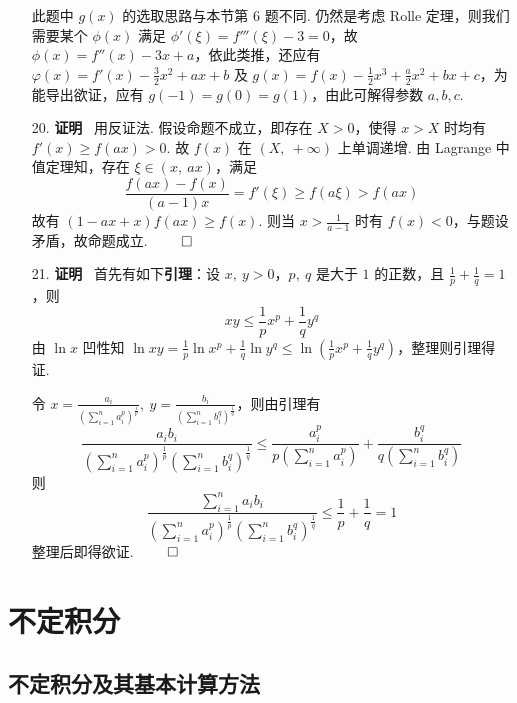 \documentclass[11pt,oneside,fontset=fandol]{ctexbook} %
\begin{document}
\begin{enumerate}
    此题中 $g(x)$ 的选取思路与本节第 6 题不同. 仍然是考虑 Rolle 定理，则我们需要某个 $\phi(x)$ 满足 $\phi'(\xi) = f'''(\xi) - 3 = 0$，故 $\phi(x) = f''(x) - 3x + a$，依此类推，还应有 $\varphi(x) = f'(x) - \frac 3 2 x^2 + ax + b$ 及 $g(x) = f(x) - \frac 1 2 x^3 + \frac a 2 x^2 + bx + c$，为能导出欲证，应有 $g(-1) = g(0) = g(1)$，由此可解得参数 $a, b, c$.
    \item[20.]
    \textbf{证明} \ 用反证法. 假设命题不成立，即存在 $X > 0$，使得 $x > X$ 时均有 $f'(x) \geqslant f(ax) > 0$. 故 $f(x)$ 在 $(X,\ +\infty)$ 上单调递增. 由 Lagrange 中值定理知，存在 $\xi \in (x,\ ax)$，满足
    \[
        \frac{f(ax)-f(x)}{(a-1)x} = f'(\xi) \geqslant f(a\xi) > f(ax)
    \]
    故有 $(1-ax+x)f(ax) \geqslant f(x)$. 则当 $x > \frac 1 {a-1}$ 时有 $f(x) < 0$，与题设矛盾，故命题成立.
    $\hfill\qed$
    \item[21.]
    \textbf{证明} \ 首先有如下\textbf{引理}：设 $x,\ y > 0$，$p,\ q$ 是大于 $1$ 的正数，且 $\frac 1 p + \frac 1 q = 1$，则
    \[
        xy \leqslant \frac 1 p x^p + \frac 1 q y^q
    \]
    由 $\ln x$ 凹性知 $\ln xy = \frac 1 p \ln x^p + \frac 1 q \ln y^q \leqslant \ln\left( \frac 1 p x^p + \frac 1 q y^q \right)$，整理则引理得证.
    
    令 $x = \frac{a_i}{\left( \sum_{i=1}^n a_i^p \right)^{\frac 1 p}},\ y = \frac{b_i}{\left( \sum_{i=1}^n b_i^q \right)^{\frac 1 q}}$，则由引理有
    \[
        \frac{a_ib_i}{\left( \sum_{i=1}^n a_i^p \right)^{\frac 1 p} \left( \sum_{i=1}^n b_i^q \right)^{\frac 1 q}} \leqslant \frac{a_i^p}{p \left( \sum_{i=1}^n a_i^p \right)} + \frac{b_i^q}{q \left( \sum_{i=1}^n b_i^q \right)}
    \]
    则
    \[
        \frac{\sum_{i=1}^n a_ib_i}{\left( \sum_{i=1}^n a_i^p \right)^{\frac 1 p} \left( \sum_{i=1}^n b_i^q \right)^{\frac 1 q}} \leqslant \frac 1 p + \frac 1 q = 1
    \]
    整理后即得欲证.
    $\hfill\qed$
\end{enumerate}

\newpage
\chapter{不定积分}

\section{不定积分及其基本计算方法}
\end{document}
